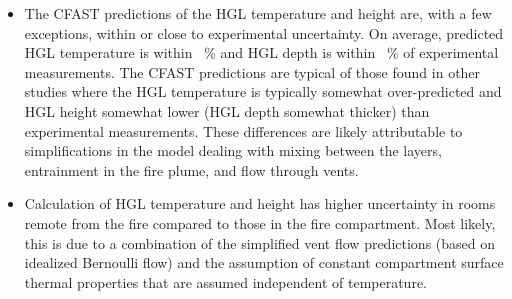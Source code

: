 \begin{itemize}
\item The CFAST predictions of the HGL temperature and height are, with a few exceptions, within or close to experimental uncertainty. On average, predicted HGL temperature is within \HGLtempavg~\% and HGL depth is within \HGLhgtavg~\% of experimental measurements. The CFAST predictions are typical of those found in other studies where the HGL temperature is typically somewhat over-predicted and HGL height somewhat lower (HGL depth somewhat thicker) than experimental measurements. These differences are likely attributable to simplifications in the model dealing with mixing between the layers, entrainment in the fire plume, and flow through vents. 
\item Calculation of HGL temperature and height has higher uncertainty in rooms remote from the fire compared to those in the fire compartment.  Most likely, this is due to a combination of the simplified vent flow predictions (based on idealized Bernoulli flow) and the assumption of constant compartment surface thermal properties that are assumed independent of temperature.
\end{itemize}




